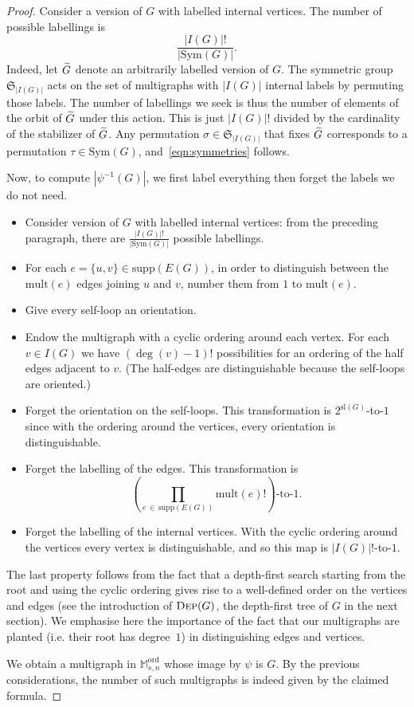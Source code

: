 \documentclass[AHL,Unicode,longabstracts,published]{cedram}
\newcommand{\abs}[1]{\left\lvert#1\right\rvert}
\newcommand{\supp}{\mathrm{supp}}
\newcommand{\ord}{\mathrm{ord}}
\newcommand{\sll}{\mathrm{sl}}
\newcommand{\Sym}{\mathrm{Sym}}
\newcommand{\mult}{\mathrm{mult}}
\newcommand{\M}{\mathbb{M}}
\newcommand{\frkS}{\mathfrak{S}}
\let\oldtilde\tilde
\renewcommand*{\tilde}[1]{\mathchoice{\widetilde{#1}}{\widetilde{#1}}{\oldtilde{#1}}{\oldtilde{#1}}}
\begin{document}
\begin{proof}
Consider a version of $G$ with labelled internal vertices. The number of possible labellings is
\begin{equation}\label{eqn:symmetries}
\frac{\abs{I(G)}!}{\abs{\Sym(G)}}.
\end{equation}
Indeed, let $\tilde{G}$ denote an arbitrarily labelled version of $G$. The symmetric group $\frkS_{\abs{I(G)}}$ acts on the set of multigraphs with $\abs{I(G)}$ internal labels by permuting those labels. The number of labellings we seek is thus the number of elements of the orbit of $\tilde{G}$ under this action. This is just $\abs{I(G)}!$ divided by the cardinality of the stabilizer of $\tilde{G}$. Any permutation $\sigma\in \frkS_{\abs{I(G)}}$ that fixes $\tilde{G}$ corresponds to a permutation $\tau\in\Sym(G)$, and~\eqref{eqn:symmetries} follows.

Now, to compute $\left|\psi^{-1}(G) \right|$, we first label everything then forget the labels we do not need.
\begin{itemize}
\item Consider version of $G$ with labelled internal vertices: from the preceding paragraph, there are $\frac{|I(G)|!}{|\Sym(G)|}$ possible labellings.
\item For each $e=\{u,v\}\in \supp(E(G))$, in order to distinguish between the $\mult(e)$ edges joining $u$ and $v$, number them from $1$ to $\mult(e)$.
\item Give every self-loop an orientation.
\item Endow the multigraph with a cyclic ordering around each vertex. For each $v\in I(G)$ we have $(\deg(v) -1)!$ possibilities for an ordering of the half edges adjacent to $v$. (The half-edges are distinguishable because the self-loops are oriented.)
\item Forget the orientation on the self-loops. This transformation is $2^{\sll(G)}$-to-$1$ since with the ordering around the vertices, every orientation is distinguishable.
\item Forget the labelling of the edges. This transformation is
\[
\left(\prod_{e\,\in\,\supp(E(G))} \mult(e)!\right)\text{-to-}1.
\]
\item Forget the labelling of the internal vertices. With the cyclic ordering around the vertices every vertex is distinguishable, and so this map is $\abs{I(G)}!$-to-$1$.
\end{itemize}
The last property follows from the fact that a depth-first search starting from the root and using the cyclic ordering gives rise to a well-defined order on the vertices and edges (see the introduction of $\textsc{Dep}(G)$, the depth-first tree of $G$ in the next section). We emphasise here the importance of the fact that our multigraphs are planted (i.e. their root has degree~$1$) in distinguishing edges and vertices.

We obtain a multigraph in $\M_{s,n}^{\ord}$ whose image by $\psi$ is $G$. By the previous considerations, the number of such multigraphs is indeed given by the claimed formula.
\end{proof}
\end{document}
